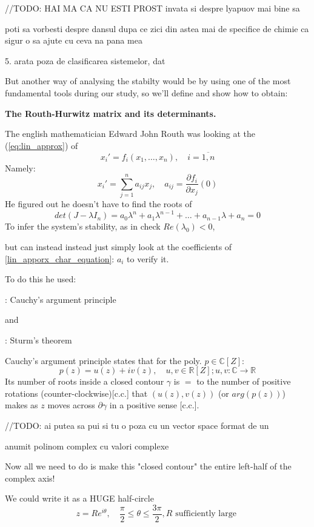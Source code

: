 \hfill\break
//TODO: HAI MA CA NU ESTI PROST invata si despre lyapuov mai bine sa

poti sa vorbesti despre dansul dupa ce zici din astea mai de
specifice de chimie ca sigur o sa ajute cu ceva na pana mea

5. arata poza de clasificarea sistemelor, dat

\hfill\break
But another way of analysing the stabilty would be by using one of
the most fundamental tools during our study, so we'll define and show
how to obtain:

\textbf{The Routh-Hurwitz matrix and its determinants.}

The english mathematician Edward John Routh was looking at the
(\ref{eq:lin_approx}) of
\[
x_i' = f_i(x_1,\dots , x_n), \quad i = \overline{1,n}
\]
Namely:
\[
x_i' =\sum_{j=1}^{n}a_{ij} x_j, \quad a_{ij} = \frac{\partial
f_i}{\partial x_j}(0)
\]
He figured out he doesn't have to find the roots of
\begin{equation}\label{lin_apporx_char_equation}
det(J - \lambda I_n) = a_0 \lambda^n + a_1 \lambda^{n-1} + \dots +
a_{n-1}\lambda + a_n = 0
\end{equation}
To infer the system's stability, as in check
$ Re(\lambda_0) < 0$,

but can instead instead just simply look at the coefficients of
\ref{lin_apporx_char_equation}: $a_{i}$ to verify it.

To do this he used:

: Cauchy's argument principle

and

: Sturm's theorem


Cauchy's argument principle states that for the poly. $p \in \mathbb{C}[Z]$:
\[
p(z) = u(z) + i v(z), \quad u, v \in \mathbb{R}[Z]; u,v : \mathbb{C}
\rightarrow \mathbb{R}
\]
Its number of roots inside a closed contour $\gamma$  is $=$ to the
number of positive rotations (counter-clockwise)[c.c.] that $(u(z),
v(z))$ (or $arg(p(z))$) makes as $z$ moves across $\partial \gamma$
in a positive sense [c.c.].

\hfill\break
//TODO: ai putea sa pui si tu o poza cu un vector space format de un
\hfill\break

anumit polinom complex cu valori complexe

Now all we need to do is make this "closed contour" the entire
left-half of the complex axis!

We could write it as a {\large HUGE} half-circle
\[
z = Re^{i \theta}, \quad \frac{\pi}{2} \leq \theta \leq \frac{3
\pi}{2}, R \text{ sufficiently large }
\]

